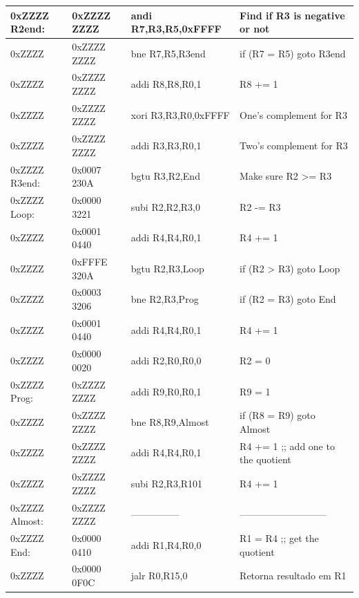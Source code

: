 \documentclass[12pt]{article}
\begin{document}
\begin{table}[H]
\begin{tabular}{|l|l|l|l|}
        0xZZZZ R2end:  & 0xZZZZ ZZZZ & andi R7,R3,R5,0xFFFF & Find if R3 is negative or not                 \\\hline
        0xZZZZ         & 0xZZZZ ZZZZ & bne  R7,R5,R3end     & if (R7 \!= R5) goto R3end                     \\\hline
        0xZZZZ         & 0xZZZZ ZZZZ & addi R8,R8,R0,1      & R8 += 1                                       \\\hline
        0xZZZZ         & 0xZZZZ ZZZZ & xori R3,R3,R0,0xFFFF & One's complement for R3                       \\\hline
        0xZZZZ         & 0xZZZZ ZZZZ & addi R3,R3,R0,1      & Two's complement for R3                       \\\hline
        0xZZZZ R3end:  & 0x0007 230A & bgtu R3,R2,End       & Make sure R2 >= R3                            \\\hline
        0xZZZZ Loop:   & 0x0000 3221 & subi R2,R2,R3,0      & R2 -= R3                                      \\\hline
        0xZZZZ         & 0x0001 0440 & addi R4,R4,R0,1      & R4 += 1                                       \\\hline
        0xZZZZ         & 0xFFFE 320A & bgtu R2,R3,Loop      & if (R2 > R3) goto Loop                        \\\hline
        0xZZZZ         & 0x0003 3206 & bne  R2,R3,Prog      & if (R2 \!= R3) goto End                       \\\hline
        0xZZZZ         & 0x0001 0440 & addi R4,R4,R0,1      & R4 += 1                                       \\\hline
        0xZZZZ         & 0x0000 0020 & addi R2,R0,R0,0      & R2 = 0                                        \\\hline
        0xZZZZ Prog:   & 0xZZZZ ZZZZ & addi R9,R0,R0,1      & R9 = 1                                        \\\hline
        0xZZZZ         & 0xZZZZ ZZZZ & bne  R8,R9,Almost    & if (R8 \!= R9) goto Almost                    \\\hline
        0xZZZZ         & 0xZZZZ ZZZZ & addi R4,R4,R0,1      & R4 += 1 ;; add one to the quotient            \\\hline
        0xZZZZ         & 0xZZZZ ZZZZ & subi R2,R3,R101      & R4 += 1                                       \\\hline
        0xZZZZ Almost: & 0xZZZZ ZZZZ & ---------------      & ---------------------------                   \\\hline
        0xZZZZ End:    & 0x0000 0410 & addi R1,R4,R0,0      & R1 = R4 ;; get the quotient                   \\\hline
        0xZZZZ         & 0x0000 0F0C & jalr R0,R15,0        & Retorna resultado em R1                       \\\hline
    \end{tabular}\label{tab:programs:div}
\end{table}
\end{document}
